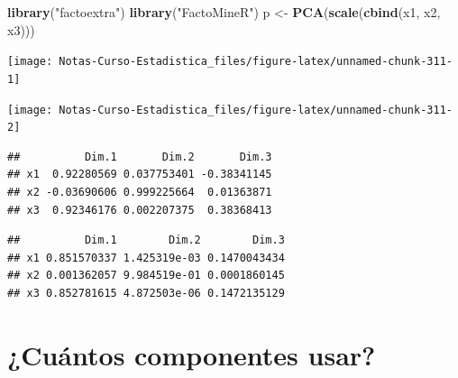 \documentclass[
  12pt,
]{book}
\newenvironment{Shaded}{\begin{snugshade}}{\end{snugshade}}
\newcommand{\KeywordTok}[1]{\textcolor[rgb]{0.13,0.29,0.53}{\textbf{#1}}}
\newcommand{\NormalTok}[1]{#1}
\newcommand{\OperatorTok}[1]{\textcolor[rgb]{0.81,0.36,0.00}{\textbf{#1}}}
\newcommand{\StringTok}[1]{\textcolor[rgb]{0.31,0.60,0.02}{#1}}
\theoremstyle{definition}
\theoremstyle{definition}
\theoremstyle{definition}
\theoremstyle{remark}
\begin{document}
\begin{Shaded}
\begin{Highlighting}[]
\KeywordTok{library}\NormalTok{(}\StringTok{"factoextra"}\NormalTok{)}
\KeywordTok{library}\NormalTok{(}\StringTok{"FactoMineR"}\NormalTok{)}
\NormalTok{p <-}\StringTok{ }\KeywordTok{PCA}\NormalTok{(}\KeywordTok{scale}\NormalTok{(}\KeywordTok{cbind}\NormalTok{(x1, x2, x3)))}
\end{Highlighting}
\end{Shaded}

\begin{center}\texttt{[image: Notas-Curso-Estadistica\_files/figure-latex/unnamed-chunk-311-1]} \end{center}

\begin{center}\texttt{[image: Notas-Curso-Estadistica\_files/figure-latex/unnamed-chunk-311-2]} \end{center}

\begin{Shaded}
\end{Shaded}

\begin{verbatim}
##          Dim.1       Dim.2       Dim.3
## x1  0.92280569 0.037753401 -0.38341145
## x2 -0.03690606 0.999225664  0.01363871
## x3  0.92346176 0.002207375  0.38368413
\end{verbatim}

\begin{Shaded}
\end{Shaded}

\begin{verbatim}
##          Dim.1        Dim.2        Dim.3
## x1 0.851570337 1.425319e-03 0.1470043434
## x2 0.001362057 9.984519e-01 0.0001860145
## x3 0.852781615 4.872503e-06 0.1472135129
\end{verbatim}

\hypertarget{cuuxe1ntos-componentes-usar}{%
\section{¿Cuántos componentes usar?}\label{cuuxe1ntos-componentes-usar}}
\end{document}
